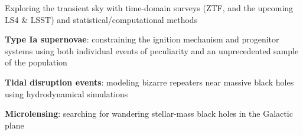 


\begin{cvpubs}


\cvpub
{ %
\begin{cvitems}
\item Exploring the transient sky with time-domain surveys (ZTF, and the upcoming LS4 \& LSST) and statistical/computational methods
\item {\bf\color{darktext}Type Ia supernovae}: constraining the ignition mechanism and progenitor systems using both individual events of peculiarity and an unprecedented sample of the population
\item {\bf\color{darktext}Tidal disruption events}: modeling bizarre repeaters near massive black holes using hydrodynamical simulations
\item {\bf\color{darktext}Microlensing}: searching for wandering stellar-mass black holes in the Galactic plane
\end{cvitems}
}


\end{cvpubs}